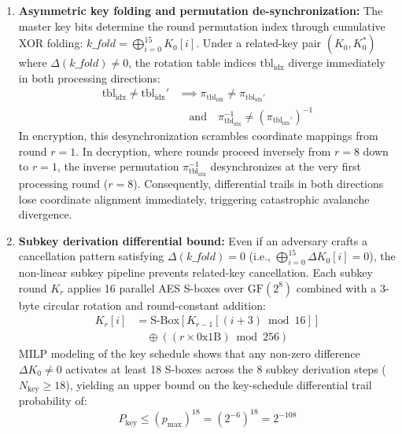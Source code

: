 \documentclass[10pt,twocolumn]{article}
\begin{document}
\begin{enumerate}
    \item \textbf{Asymmetric key folding and permutation de-synchronization:} The master key bits determine the round permutation index through cumulative XOR folding: $\mathit{k\_fold} = \bigoplus_{i=0}^{15} K_0[i]$. Under a related-key pair $(K_0, K_0^*)$ where $\Delta(\mathit{k\_fold}) \neq 0$, the rotation table indices $\text{tbl}_{\text{idx}}$ diverge immediately in both processing directions:
    \begin{equation}
    \begin{aligned}
        \text{tbl}_{\text{idx}} \neq \text{tbl}_{\text{idx}}' &\implies \pi_{\text{tbl}_{\text{idx}}} \neq \pi_{\text{tbl}_{\text{idx}}'} \\
        &\quad \text{and} \quad \pi_{\text{tbl}_{\text{idx}}}^{-1} \neq (\pi_{\text{tbl}_{\text{idx}}'})^{-1}
    \end{aligned}
    \end{equation}
    In encryption, this desynchronization scrambles coordinate mappings from round $r=1$. In decryption, where rounds proceed inversely from $r=8$ down to $r=1$, the inverse permutation $\pi_{\text{tbl}_{\text{idx}}}^{-1}$ desynchronizes at the very first processing round ($r=8$). Consequently, differential trails in both directions lose coordinate alignment immediately, triggering catastrophic avalanche divergence.
    
    \item \textbf{Subkey derivation differential bound:} Even if an adversary crafts a cancellation pattern satisfying $\Delta(\mathit{k\_fold}) = 0$ (i.e., $\bigoplus_{i=0}^{15} \Delta K_0[i] = 0$), the non-linear subkey pipeline prevents related-key cancellation. Each subkey round $K_r$ applies 16 parallel AES S-boxes over $\text{GF}(2^8)$ combined with a 3-byte circular rotation and round-constant addition:
    \begin{equation}
    \begin{aligned}
        K_r[i] &= \text{S-Box}\left[K_{r-1}[(i+3) \bmod 16]\right] \\
        &\quad \oplus \left((r \times \text{0x1B}) \bmod 256\right)
    \end{aligned}
    \end{equation}
    MILP modeling of the key schedule shows that any non-zero difference $\Delta K_0 \neq 0$ activates at least 18 S-boxes across the 8 subkey derivation steps ($N_{\text{key}} \ge 18$), yielding an upper bound on the key-schedule differential trail probability of:
    \begin{equation}
        P_{\text{key}} \le (p_{\max})^{18} = (2^{-6})^{18} = 2^{-108}
    \end{equation}
    

\end{enumerate}
\end{document}
